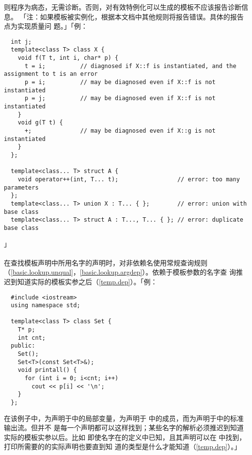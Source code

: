 则程序为病态，无需诊断。否则，对有效特例化可以生成的模板不应该报告诊断信息。
「注：如果模板被实例化，根据本文档中其他规则将报告错误。具体的报告点为实现质量问
题。」「例：
\begin{lstlisting}
  int j;
  template<class T> class X {
    void f(T t, int i, char* p) {
      t = i;          // diagnosed if X::f is instantiated, and the assignment to t is an error
      p = i;          // may be diagnosed even if X::f is not instantiated
      p = j;          // may be diagnosed even if X::f is not instantiated
    }
    void g(T t) {
      +;              // may be diagnosed even if X::g is not instantiated
    }
  };

  template<class... T> struct A {
    void operator++(int, T... t);                 // error: too many parameters
  };
  template<class... T> union X : T... { };        // error: union with base class
  template<class... T> struct A : T..., T... { }; // error: duplicate base class
\end{lstlisting}」

\paragraph{}
在查找模板声明中所用名字的声明时，对非依赖名使用常规查询规则
（\ref{basic.lookup.unqual}，\ref{basic.lookup.argdep}）。依赖于模板参数的名字查
询推迟到知道实际的模板实参之后（\ref{temp.dep}）。「例：
\begin{lstlisting}
  #include <iostream>
  using namespace std;

  template<class T> class Set {
    T* p;
    int cnt;
  public:
    Set();
    Set<T>(const Set<T>&);
    void printall() {
      for (int i = 0; i<cnt; i++)
        cout << p[i] << '\n';
    }
  };
\end{lstlisting}
在该例子中，为声明于中的局部变量，为声明于
中的成员，而为声明于中的标准输出流。但并不
是每一个声明都可以这样找到；某些名字的解析必须推迟到知道实际的模板实参以后。比如
即使名字在的定义中已知，且其声明可以在
中找到，打印所需要的的实际声明也要直到知
道的类型是什么才能知道（\ref{temp.dep}）。」

